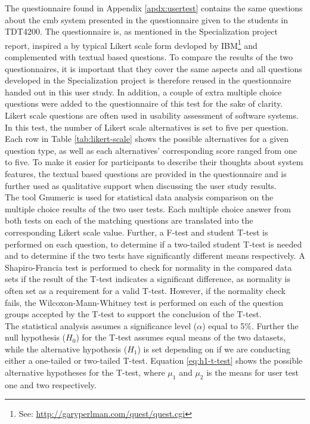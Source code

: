 The questionnaire found in Appendix \ref{apdx:usertest} contains the same questions about the \gls{cmb} system presented in the questionnaire given to the students in TDT4200. The questionnaire is, as mentioned in the Specialization project report, inspired a by typical Likert scale form devloped by IBM\footnote{See: \url{http://garyperlman.com/quest/quest.cgi}} and complemented with textual based questions. To compare the results of the two questionnaires, it is important that they cover the same aspects and all questions developed in the Specialization project is therefore reused in the questionnaire handed out in this user study. In addition, a couple of extra multiple choice questions were added to the questionnaire of this test for the sake of clarity. \\

Likert scale questions are often used in usability assessment of software systems. In this test, the number of Likert scale alternatives is set to five per question. Each row in Table \ref{tab:likert-scale} shows the possible alternatives for a given question type, as well as each alternatives' corresponding score ranged from one to five. To make it easier for participants to describe their thoughts about system features, the textual based questions are provided in the questionnaire and is further used as qualitative support when discussing the user study results. \\

The tool Gnumeric \cite{GNUMERIC} is used for statistical data analysis comparison on the multiple choice results of the two user tests. Each multiple choice answer from both tests on each of the matching questions are translated into the corresponding Likert scale value. Further, a F-test and student T-test is performed on each question, to determine if a two-tailed student T-test is needed and to determine if the two tests have significantly different means respectively. A Shapiro-Francia test is performed to check for normality in the compared data sets if the result of the T-test indicates a significant difference, as normality is often set as a requirement for a valid T-test. However, if the normality check fails, the Wilcoxon-Mann-Whitney test is performed on each of the question groups accepted by the T-test to support the conclusion of the T-test. \\

The statistical analysis assumes a significance level ($\alpha$) equal to 5\%. Further the null hypothesis ($H_0$) for the T-test assumes equal means of the two datasets, while the alternative hypothesis ($H_1$) is set depending on if we are conducting either a one-tailed or two-tailed T-test. Equation \ref{eq:h1-t-test} shows the possible alternative hypotheses for the T-test, where $\mu_{1}$ and $\mu_{2}$ is the means for user test one and two respectively.


